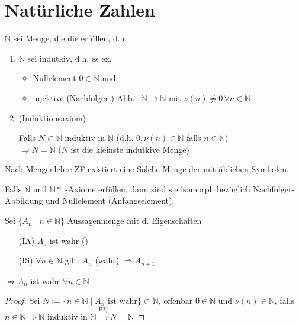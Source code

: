 \section{Natürliche Zahlen}
\begin{*definition}
$\mathbb{N}$ sei Menge, die die  erfüllen, d.h.
\begin{enumerate}[label={P\arabic*)}]
	\item $\mathbb{N}$ sei indutkiv, d.h. es ex.
	\begin{itemize}
		\item Nullelement $0\in \mathbb{N}$ und
		\item injektive (Nachfolger-) Abb. $:\mathbb{N}\rightarrow\mathbb{N}$ mit $\nu(n)\neq 0\,\forall n\in \mathbb{N}$
	\end{itemize}
	\item (Induktionsaxiom)
	
	Falls $N\subset\mathbb{N}$ induktiv in $\mathbb{N}$ (d.h. $0,\nu(n)\in\mathbb{N}$ falls $n\in\mathbb{N}$)\\
	$\Rightarrow N=\mathbb{N}$ ($N$ ist die kleinste indutkive Menge)
\end{enumerate}

Nach Mengenlehre ZF existiert eine Solche Menge der  mit üblichen Symbolen.
\end{*definition}

\begin{theorem}
	Falls $\mathbb{N}$ und $\mathbb{N}*$ -Axiome erfüllen, dann sind sie isomorph bezüglich Nachfolger-Abbildung und Nullelement (Anfangselement).
\end{theorem}

\begin{proposition} 
	Sei $\{A_n \mid n\in\mathbb{N}\}$ Aussagenmenge mit d. Eigenschaften
	\begin{itemize}
		\item[(IA)] $A_0$ ist wahr ()
		\item[(IS)] $\forall n\in\mathbb{N}$ gilt: $A_n$ (wahr) $\Rightarrow A_{n+1}$
	\end{itemize}
	$\Rightarrow A_n$ ist wahr $\forall n\in\mathbb{N}$
\end{proposition}

\begin{proof}
	Sei $N := \{n \in \mathbb{N} \mid A_n \text{ ist wahr}\} \subset \mathbb{N}$, offenbar $0 \in \mathbb{N}$ und $\nu(n) \in \mathbb{N}$, falls $n \in \mathbb{N} \Rightarrow \mathbb{N}$ induktiv in $\mathbb{N} \overset{\text{P2)}}{\Rightarrow} N = \mathbb{N}$
\end{proof}

